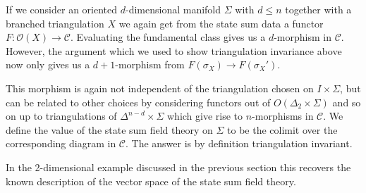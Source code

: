 If we consider an oriented $d$-dimensional manifold $\Sigma$ with $d\leq n$ together with a  branched triangulation $X$ we again get from the state sum data a functor $F\colon \mathcal{O}(X)\longrightarrow \mathcal{C}$.
Evaluating the fundamental class gives us a $d$-morphism in
$\mathcal{C}$.
However, the argument which we used to show triangulation invariance above now only gives us a $d+1$-morphism from $F(\sigma_X)\longrightarrow  F(\sigma_X')$.

This morphism is again not independent of the triangulation chosen on $I\times \Sigma $, but can be related to other choices by considering functors out of $O(\Delta_2 \times \Sigma)$ and so on up to triangulations of $\Delta^{n-d}\times \Sigma $ which give rise to $n$-morphisms in $\mathcal{C}$.
We define the value of the state sum field theory on $\Sigma$ to be the colimit over the corresponding diagram in $\mathcal{C}$.
The answer is by definition triangulation invariant.


In the 2-dimensional example discussed in the previous section this recovers the known description of the vector space of the state sum field theory.

